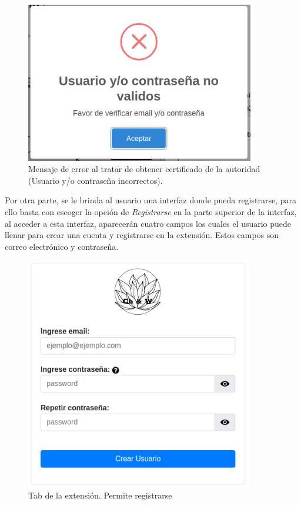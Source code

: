 \documentclass[12pt, a4paper, titlepage]{report}
\begin{document}
    			\begin{figure}[H]
    				\begin{center}	\includegraphics[width=10cm]{./imagenes/Disenio/Componente_1/UI_certNotSavedInStorage.PNG}
    					\caption[Mensaje de error]{Mensaje de error al tratar de obtener certificado de la autoridad (Usuario y/o contraseña incorrectos).}
    					\label{fig:UI_certNotSavedInStorage}
    				\end{center}
    			\end{figure}
    			
    			
    			Por otra parte, se le brinda al usuario una interfaz donde pueda registrarse, para ello basta con escoger la opción de \textit{Registrarse} en la parte superior de la interfaz, al acceder a esta interfaz, aparecerán cuatro campos los cuales el usuario puede llenar para crear una cuenta y registrarse en la extensión. Estos campos son correo electrónico y contraseña.
    			
    			\begin{figure}[H]
    				\begin{center}	\includegraphics[width=10cm]{./imagenes/Disenio/Componente_1/UI_registro1.PNG}
    					\caption{Tab de la extensión. Permite registrarse}
    					\label{fig:CI_TabRegistro}
    				\end{center}
    			\end{figure}
    			
\end{document}
